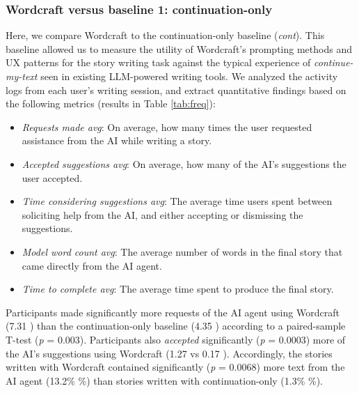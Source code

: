 \subsubsection{Wordcraft versus baseline 1: continuation-only}
Here, we compare Wordcraft to the continuation-only baseline (\textit{cont}). 
This baseline allowed us to measure the utility of Wordcraft's prompting methods and UX patterns for the story writing task against the typical experience of \textit{continue-my-text} seen in existing LLM-powered writing tools.
We analyzed the activity logs from each user's writing session, and extract quantitative findings based on the following metrics (results in Table \ref{tab:freq}):

\begin{itemize}
    \item \textit{Requests made avg}: On average, how many times the user requested assistance from the AI while writing a story.
    \item \textit{Accepted suggestions avg}: On average, how many of the AI's suggestions the user accepted.
    \item \textit{Time considering suggestions avg}: The average time users spent between soliciting help from the AI, and either accepting or dismissing the suggestions.
    \item \textit{Model word count avg}: The average number of words in the final story that came directly from the AI agent.
    \item \textit{Time to complete avg}: The average time spent to produce the final story.
\end{itemize}


Participants made significantly more requests of the AI agent using Wordcraft (7.31 ) than the continuation-only baseline (4.35 ) according to a paired-sample T-test (\textit{p} = 0.003). Participants also \textit{accepted} significantly (\textit{p} = 0.0003) more of the AI's suggestions using Wordcraft (1.27  vs 0.17 ). Accordingly, the stories written with Wordcraft contained significantly (\textit{p} = 0.0068) more text from the AI agent (13.2\% \%) than stories written with continuation-only (1.3\% \%).

